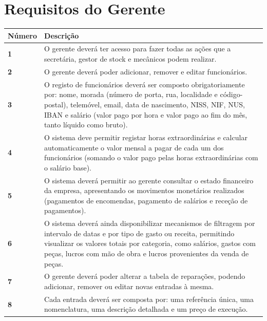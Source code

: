 \documentclass[11pt,a4paper]{article}
\begin{document}
	\vspace{1cm}
	
	\section*{Requisitos do Gerente}
	
	\begin{tabularx}{\textwidth}{@{}|l|X|@{}}
		\hline
		\rowcolor{gray!10} \textbf{Número} & \textbf{Descrição} \\ \hline
		\textbf{1} & O gerente deverá ter acesso para fazer todas as ações que a secretária, gestor de stock e mecânicos podem realizar. \\ \hline
		\textbf{2} & O gerente deverá poder adicionar, remover e editar funcionários. \\ \hline
		\textbf{3} & O registo de funcionários deverá ser composto obrigatoriamente por: nome, morada (número de porta, rua, localidade e código-postal), telemóvel, email, data de nascimento, NISS, NIF, NUS, IBAN e salário (valor pago por hora e valor pago ao fim do mês, tanto líquido como bruto). \\ \hline
		\textbf{4} & O sistema deve permitir registar horas extraordinárias e calcular automaticamente o valor mensal a pagar de cada um dos funcionários (somando o valor pago pelas horas extraordinárias com o salário base). \\ \hline
		\textbf{5} & O sistema deverá permitir ao gerente consultar o estado financeiro da empresa, apresentando os movimentos monetários realizados (pagamentos de encomendas, pagamento de salários e receção de pagamentos). \\ \hline
		\textbf{6} & O sistema deverá ainda disponibilizar mecanismos de filtragem por intervalo de datas e por tipo de gasto ou receita, permitindo visualizar os valores totais por categoria, como salários, gastos com peças, lucros com mão de obra e lucros provenientes da venda de peças. \\ \hline
		\textbf{7} & O gerente deverá poder alterar a tabela de reparações, podendo adicionar, remover ou editar novas entradas à mesma. \\ \hline
		\textbf{8} & Cada entrada deverá ser composta por: uma referência única, uma nomenclatura, uma descrição detalhada e um preço de execução. \\ \hline
	\end{tabularx}
	
	\vspace{1cm}
	
\end{document}

